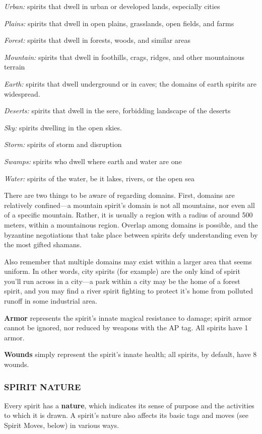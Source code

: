 \documentclass[oneside,10pt]{article}
\begin{document}
\begin{multicols}{2}
\begin{dent}
\textit{Urban:} spirits that dwell in urban or developed lands, especially cities

\textit{Plains:} spirits that dwell in open plains, grasslands, open
fields, and farms

\textit{Forest:} spirits that dwell in forests, woods, and similar areas

\textit{Mountain:} spirits that dwell in foothills, crags, ridges, and
other mountainous terrain

\textit{Earth:} spirits that dwell underground or in caves; the domains of earth spirits are widespread.

\textit{Deserts:} spirits that dwell in the sere, forbidding landscape
of the deserts

\textit{Sky:} spirits dwelling in the open skies.

\textit{Storm:} spirits of storm and disruption

\textit{Swamps:} spirits who dwell where earth and water are one

\textit{Water:} spirits of the water, be it lakes, rivers, or the open
sea
\end{dent}
There are two things to be aware of regarding domains. First,
domains are relatively confined—a mountain spirit’s domain
is not all mountains, nor even all of a specific mountain. Rather, it is usually a region with a radius of around 500 meters,
within a mountainous region. Overlap among domains is possible, and the byzantine negotiations that take place between
spirits defy understanding even by the most gifted shamans.

Also remember that multiple domains may exist within a
larger area that seems uniform. In other words, city spirits
(for example) are the only kind of spirit you’ll run across in a
city—a park within a city may be the home of a forest spirit,
and you may find a river spirit fighting to protect it’s home
from polluted runoff in some industrial area.

\textbf{Armor} represents the spirit’s innate magical resistance to
damage; spirit armor cannot be ignored, nor reduced by
weapons with the AP tag. All spirits have 1 armor.

\textbf{Wounds} simply represent the spirit’s innate health; all spirits,
by default, have 8 wounds.

\subsubsection{SPIRIT NATURE}
Every spirit has a \textbf{nature}, which indicates its sense of purpose
and the activities to which it is drawn. A spirit’s nature also
affects its basic tags and moves (see Spirit Moves, below) in
various ways.


\end{multicols}
\end{document}
